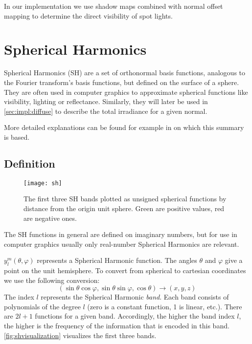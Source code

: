 \documentclass[thesis.tex]{subfiles}
\begin{document}
In our implementation we use shadow maps combined with normal offset mapping to determine the direct visibility of spot lights. 


\section{Spherical Harmonics}\label{sec:preq:sh}
Spherical Harmonics (SH) are a set of orthonormal basis functions, analogous to the Fourier transform's basis functions, but defined on the surface of a sphere.
They are often used in computer graphics to approximate spherical functions like visibility, lighting or reflectance. Similarly, they will later be used in \autoref{sec:impl:diffuse} to describe the total irradiance for a given normal.

More detailed explanations can be found for example in \cite{bib:grittysh, bib:stupidsh} on which this summary is based.

\subsection{Definition} \label{chap:sh:def}
\begin{figure}[h]
	\centering
	\texttt{[image: sh]}
	\caption{\cite{bib:grittysph} The first three SH bands plotted as unsigned spherical functions by distance from the origin unit sphere. Green are positive values, red are negative ones.}
	\label{fig:shvisualization}
\end{figure}
The SH functions in general are defined on imaginary numbers, but for use in computer graphics usually only real-number Spherical Harmonics are relevant.

$y^m_l(\theta, \varphi)$ represents a Spherical Harmonic function.
The angles $\theta$ and $\varphi$ give a point on the unit hemisphere.
To convert from spherical to cartesian coordinates we use the following conversion:
\begin{equation} \label{equ:postoangle}
(\sin\theta\cos\varphi, \sin\theta\sin\varphi, \cos\theta) \rightarrow (x,y,z)
\end{equation}
The index $l$ represents the Spherical Harmonic \emph{band}.
Each band consists of polynomials of the degree $l$ (zero is a constant function, 1 is linear, etc.).
There are $2l+1$ functions for a given band.
Accordingly, the higher the band index $l$, the higher is the frequency of the information that is encoded in this band.
\autoref{fig:shvisualization} visualizes the first three bands.
\end{document}
